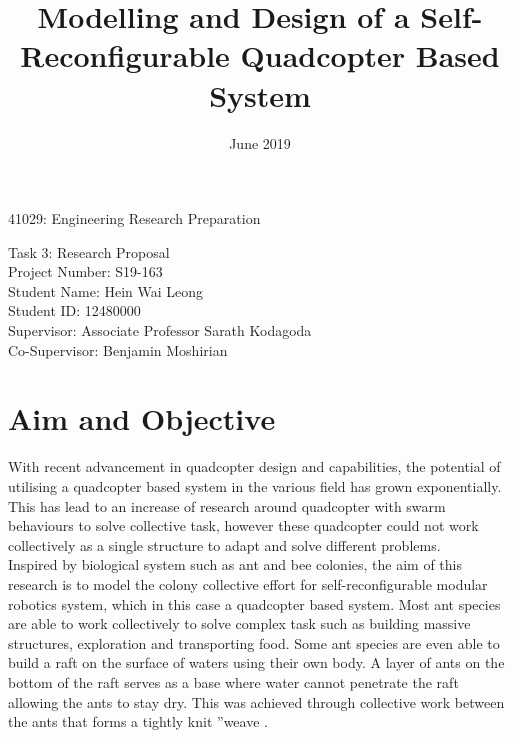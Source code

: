 \documentclass[12pt,A4]{article}
\title{Modelling and Design of a Self-Reconfigurable Quadcopter Based System}
\date{June 2019}
\begin{document}
	\maketitle
	\begin{center}
		41029: Engineering Research Preparation\\\centering
		
		Task 3: Research Proposal\\\centering
		\bigskip
		\bigskip
		\bigskip
		\bigskip
		\bigskip
		\bigskip
		\bigskip
		\bigskip
		\bigskip
		\bigskip
		\bigskip
		\bigskip
		\bigskip
		\bigskip
		\bigskip
		Project Number: S19-163\\\centering
		Student Name: Hein Wai Leong\\\centering
		Student ID: 12480000\\\centering
		Supervisor: Associate Professor Sarath Kodagoda\\\centering
		Co-Supervisor: Benjamin Moshirian\\\centering
	\end{center}
	\pagebreak
	
	\tableofcontents
	
	\pagebreak
	
	\section{Aim and Objective}
	
	With recent advancement in quadcopter design and capabilities, the potential of utilising a quadcopter based system in the various field has grown exponentially. This has lead to an increase of research around quadcopter with swarm behaviours to solve collective task, however these quadcopter could not work collectively as a single structure to adapt and solve different problems.\\
	
	Inspired by biological system such as ant and bee colonies, the aim of this research is to model the colony collective effort for self-reconfigurable modular robotics system, which in this case a quadcopter based system. Most ant species are able to work collectively to solve complex task such as building massive structures, exploration and transporting food. Some ant species are even able to build a raft on the surface of waters using their own body. A layer of ants on the bottom of the raft serves as a base where water cannot penetrate the
	raft allowing the ants to stay dry. This was achieved through collective work
	between the ants that forms a tightly knit ”weave \citep{mlot2011fire}.\\
	
\end{document}
